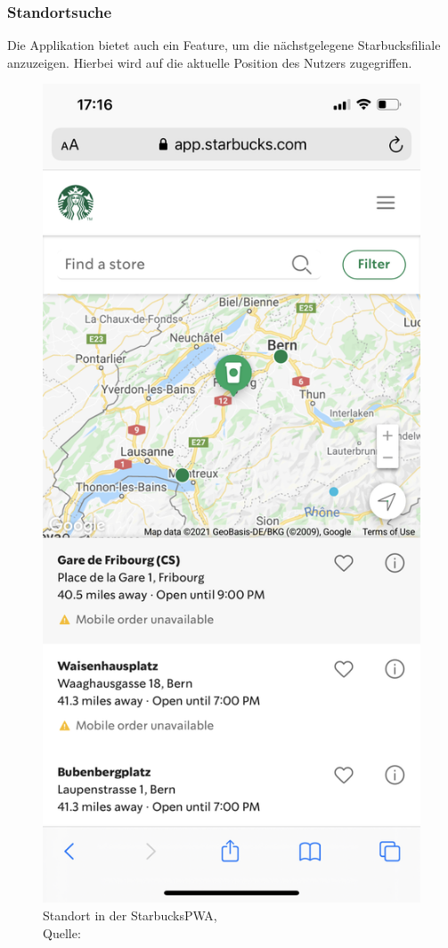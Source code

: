 \subsubsection{Standortsuche}
Die Applikation bietet auch ein Feature, um die nächstgelegene Starbucksfiliale anzuzeigen. Hierbei wird auf die aktuelle Position des Nutzers zugegriffen. 
 \begin{figure}[H]
	\centering
	\includegraphics[scale=0.15]{images/starbucks_standort.jpeg}
	\caption[Standort in der Starbucks \ac{PWA}]{Standort in der Starbucks\ac {PWA},\\ Quelle: \cite{starbucksPwaStandort}}
	\label{img: Standort in der Starbucks PWA}
\end{figure}

